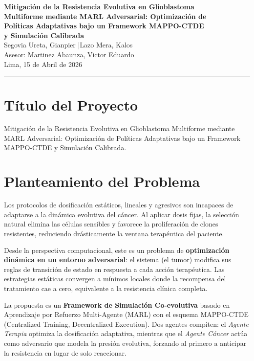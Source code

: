 \documentclass[a4paper,11pt]{article}
\begin{document}
\begin{center}
  {\large\bfseries Mitigación de la Resistencia Evolutiva en Glioblastoma\\
  Multiforme mediante MARL Adversarial: Optimización de\\
  Políticas Adaptativas bajo un Framework MAPPO-CTDE\\
  y Simulación Calibrada}\\[8pt]
  {\small Segovia Ureta, Gianpier \quad|\quad Lazo Mera, Kalos}\\
  {\small Asesor: Martinez Abaunza, Victor Eduardo}\\
  {\small Lima, 15 de Abril de 2026}
\end{center}

\vspace{4pt}
\hrule
\vspace{8pt}

\section{Título del Proyecto}

Mitigación de la Resistencia Evolutiva en Glioblastoma Multiforme mediante
MARL Adversarial: Optimización de Políticas Adaptativas bajo un Framework
MAPPO-CTDE y Simulación Calibrada.

\section{Planteamiento del Problema}

Los protocolos de dosificación estáticos, lineales y agresivos son incapaces de adaptarse a la
dinámica evolutiva del cáncer. Al aplicar dosis fijas, la selección natural
elimina las células sensibles y favorece la proliferación de clones resistentes,
reduciendo drásticamente la ventana terapéutica del paciente.

Desde la perspectiva computacional, este es un problema de \textbf{optimización
dinámica en un entorno adversarial}: el sistema (el tumor) modifica sus reglas
de transición de estado en respuesta a cada acción terapéutica. Las estrategias
estáticas convergen a mínimos locales donde la recompensa del tratamiento cae a
cero, equivalente a la resistencia clínica completa.

La propuesta es un \textbf{Framework de Simulación Co-evolutiva} basado en
Aprendizaje por Refuerzo Multi-Agente (MARL) con el esquema MAPPO-CTDE
(Centralized Training, Decentralized Execution). Dos agentes compiten: el
\textit{Agente Terapia} optimiza la dosificación adaptativa, mientras que el
\textit{Agente Cáncer} actúa como adversario que modela la presión evolutiva,
forzando al primero a anticipar la resistencia en lugar de solo reaccionar.
\end{document}
